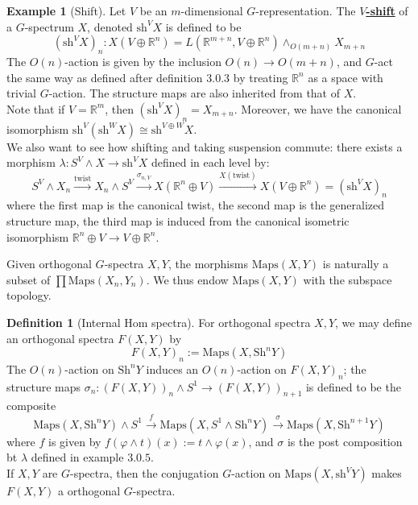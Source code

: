 \documentclass{article}
\theoremstyle{definition}
\newtheorem{definition}[theorem]{Definition}
\newtheorem{example}[theorem]{Example}
\begin{document}
\begin{tcolorbox}[colback=yellow!5!white,colframe=yellow!30!white]
\begin{example}[Shift]
    Let $V$ be an $m$-dimensional $G$-representation. The $V$\underline{\textbf{-shift}} of a $G$-spectrum $X$, denoted $\textrm{sh}^VX$ is defined to be
    \[(\textrm{sh}^VX)_n: X(V\oplus \mathbb{R}^n)=L(\mathbb{R}^{m+n}, V\oplus \mathbb{R}^n)\wedge_{O(m+n)}X_{m+n}\]
    The $O(n)$-action is given by the inclusion $O(n)\to O(m+n)$, and $G$-act the same way as defined after definition $3.0.3$ by treating $\mathbb{R}^n$ as a space with trivial $G$-action. The structure maps are also inherited from that of $X$.\\
    
    Note that if $V=\mathbb{R}^m$, then $(\textrm{sh}^VX)_n=X_{m+n}$. Moreover, we have the canonical isomorphism $\textrm{sh}^V(\textrm{sh}^WX)\cong \textrm{sh}^{V\oplus W}X$. \\

    We also want to see how shifting and taking suspension commute: there exists a morphism $\lambda: S^V\wedge X\to \textrm{sh}^VX$ defined in each level by:
    \[S^V\wedge X_n\xrightarrow{\textrm{twist}}X_n\wedge S^V\xrightarrow{\sigma_{n,V}}X(\mathbb{R}^n\oplus V)\xrightarrow{X(\textrm{twist})}X(V\oplus \mathbb{R}^n)=(\textrm{sh}^VX)_n\]
where the first map is the canonical twist, the second map is the generalized structure map, the third map is induced from the canonical isometric isomorphism $\mathbb{R}^n\oplus V\to V\oplus \mathbb{R}^n$. 



\end{example}
\end{tcolorbox}
Given orthogonal $G$-spectra $X,Y$, the morphisms $\textrm{Maps}(X,Y)$ is naturally a subset of $\prod \textrm{Maps}(X_n,Y_n)$. We thus endow $\textrm{Maps}(X,Y)$ with the subspace topology. 
\begin{tcolorbox}[colback=purple!5!white,colframe=purple!75!black]
\begin{definition}[Internal Hom spectra]
For orthogonal spectra $X,Y$, we may define an orthogonal spectra $F(X,Y)$ by 
\[F(X,Y)_n:=\textrm{Maps}(X, \textrm{Sh}^nY)\]
The $O(n)$-action on $\textrm{Sh}^nY$ induces an $O(n)$-action on $F(X,Y)_n$; the structure maps $\sigma_n: (F(X,Y))_n\wedge S^1\to (F(X,Y))_{n+1}$ is defined to be the composite
\[\textrm{Maps}(X,\textrm{Sh}^nY)\wedge S^1\xrightarrow{f} \textrm{Maps}(X,S^1\wedge \textrm{Sh}^nY)\xrightarrow{\sigma} \textrm{Maps}(X,\textrm{Sh}^{n+1}Y)\]
where $f$ is given by $f(\varphi\wedge t)(x):=t\wedge \varphi(x) $, and $\sigma$ is the post composition bt $\lambda$ defined in example $3.0.5$. \\

If $X,Y$ are $G$-spectra, then the conjugation $G$-action on $\textrm{Maps}(X,\textrm{sh}^VY)$ makes $F(X,Y)$ a orthogonal $G$-spectra. 
\end{definition}
\end{tcolorbox}
\end{document}
